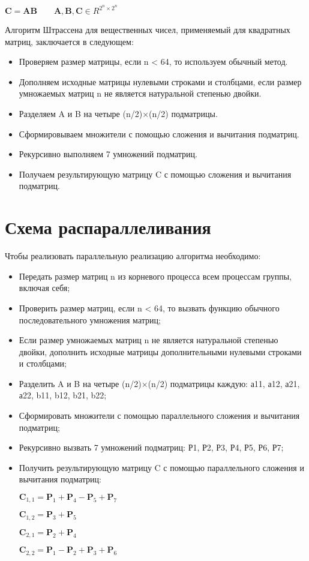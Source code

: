 \documentclass{report}
\begin{document}
    ${\displaystyle \mathbf {C} =\mathbf {A} \mathbf {B} \qquad \mathbf {A} ,\mathbf {B} ,\mathbf {C} \in R^{2^{n}\times 2^{n}}}$

Алгоритм Штрассена для вещественных чисел, применяемый для квадратных матриц, заключается в следующем:
\begin{itemize}
    \item Проверяем размер матрицы, если n < 64, то используем обычный метод.
    \item Дополняем исходные матрицы нулевыми строками и столбцами, если размер умножаемых матриц n не является натуральной степенью двойки. 
    \item Разделяем A и B на четыре (n/2)×(n/2) подматрицы.
    \item Сформировываем множители с помощью сложения и вычитания подматриц.
    \item Рекурсивно выполняем 7 умножений подматриц.
    \item Получаем результирующую матрицу C с помощью сложения и вычитания подматриц.
\end{itemize}
\newpage

\section*{Схема распараллеливания}
Чтобы реализовать параллельную реализацию алгоритма необходимо:
\begin{itemize}
    \item Передать размер матриц n из корневого процесса всем процессам группы, включая себя;
    \item Проверить размер матриц, если n < 64, то вызвать функцию обычного последовательного умножения матриц;
    \item Если размер умножаемых матриц n не является натуральной степенью двойки, дополнить исходные матрицы дополнительными нулевыми строками и столбцами;
    \item Разделить A и B на четыре (n/2)×(n/2) подматрицы каждую: а11, а12, а21, а22, b11, b12, b21, b22;
    \item Сформировать множители с помощью параллельного сложения и вычитания подматриц;
    \item Рекурсивно вызвать 7 умножений подматриц: Р1, Р2, Р3, Р4, Р5, Р6, Р7;
    \item Получить результирующую матрицу C с помощью параллельного сложения и вычитания подматриц:
    
        ${\displaystyle \mathbf {C}_{1,1}=\mathbf {P}_{1}+\mathbf {P}_{4}-\mathbf {P}_{5}+\mathbf {P}_{7}}$
    
        ${\displaystyle \mathbf {C} _{1,2}=\mathbf {P} _{3}+\mathbf {P} _{5}}$
    
        ${\displaystyle \mathbf {C} _{2,1}=\mathbf {P} _{2}+\mathbf {P} _{4}}$
    
        ${\displaystyle \mathbf {C} _{2,2}=\mathbf {P} _{1}-\mathbf {P} _{2}+\mathbf {P} _{3}+\mathbf {P} _{6}}$
    
\end{itemize}
\newpage
\end{document}
